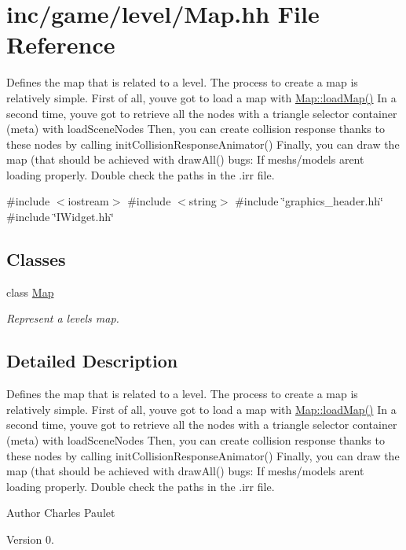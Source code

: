 \hypertarget{Map_8hh}{}\section{inc/game/level/\+Map.hh File Reference}
\label{Map_8hh}


Defines the map that is related to a level. The process to create a map is relatively simple. First of all, you\textquotesingle{}ve got to load a map with \hyperlink{classMap_a37024e6d47ca10cf83a331635fe041b7}{Map\+::load\+Map()} In a second time, you\textquotesingle{}ve got to retrieve all the nodes with a triangle selector container (meta) with load\+Scene\+Nodes Then, you can create collision response thanks to these nodes by calling init\+Collision\+Response\+Animator() Finally, you can draw the map (that should be achieved with draw\+All() bugs\+: If meshs/models arent loading properly. Double check the paths in the .irr file.  


{\ttfamily \#include $<$iostream$>$}\newline
{\ttfamily \#include $<$string$>$}\newline
{\ttfamily \#include \char`\"{}graphics\+\_\+header.\+hh\char`\"{}}\newline
{\ttfamily \#include \char`\"{}I\+Widget.\+hh\char`\"{}}\newline
\subsection*{Classes}
\begin{DoxyCompactItemize}
\item 
class \hyperlink{classMap}{Map}
\begin{DoxyCompactList}\small\item\em Represent a level\textquotesingle{}s map. \end{DoxyCompactList}\end{DoxyCompactItemize}


\subsection{Detailed Description}
Defines the map that is related to a level. The process to create a map is relatively simple. First of all, you\textquotesingle{}ve got to load a map with \hyperlink{classMap_a37024e6d47ca10cf83a331635fe041b7}{Map\+::load\+Map()} In a second time, you\textquotesingle{}ve got to retrieve all the nodes with a triangle selector container (meta) with load\+Scene\+Nodes Then, you can create collision response thanks to these nodes by calling init\+Collision\+Response\+Animator() Finally, you can draw the map (that should be achieved with draw\+All() bugs\+: If meshs/models arent loading properly. Double check the paths in the .irr file. 

\begin{DoxyAuthor}{Author}
Charles Paulet 
\end{DoxyAuthor}
\begin{DoxyVersion}{Version}
0. 
\end{DoxyVersion}
